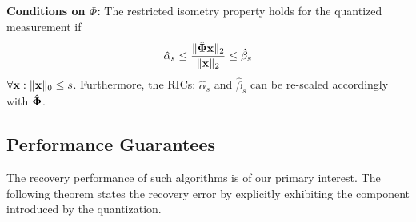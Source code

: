 \documentclass{article}
\begin{document}
 
{\bf Conditions on ${\Phi}$:} The restricted isometry property holds for the quantized measurement if
\begin{equation}
    \hat{\alpha}_{s} \leq \frac{\|\hat{{\bf \Phi}} {\bf x}\|_2}{\|{\bf x}\|_2} \leq \hat{\beta}_{s}
\end{equation}
$\forall {\bf x}: \| {\bf x}\|_0 \leq s$. Furthermore, the RICs: $\hat{\alpha}_s$ and $\hat{\beta}_s$ can be re-scaled accordingly with $\hat{\bf \Phi}$.

\subsection{Performance Guarantees}
The recovery performance of such algorithms is of our primary interest. The following theorem states the recovery error by explicitly exhibiting the component introduced by the quantization.
\end{document}
